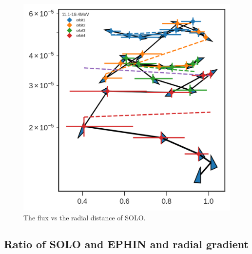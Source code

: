 \begin{figure}
    \centering
    \includegraphics{images/ACR/SOLO-flux_only.png}
    \caption{The flux vs the radial distance of SOLO.}
    \label{fig:fluxvsdistance}  
\end{figure}


\subsection{Ratio of SOLO and EPHIN and radial gradient}

